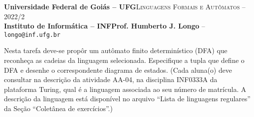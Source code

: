 \documentclass[12pt]{article}
\def\ua{04}
\begin{document}
 \begin{tcolorbox}[rounded corners, colback=blue!3, colframe=blue!40!black]
  \footnotesize\textbf{Universidade Federal de Goiás -- UFG}\hfill \textsc{Linguagens Formais e Autômatos -- 2022/2}\\
  \footnotesize\textbf{Instituto de Informática -- INF\hfill Prof. Humberto J. Longo} -- \scriptsize\texttt{longo@inf.ufg.br}
 \end{tcolorbox}\bigskip
%
\begin{tcolorbox}[rounded corners, colback=blue!2, colframe=blue!40!black, title=\textbf{Atividade AA-\ua}]
   Nesta tarefa deve-se propôr um autômato finito determinístico (DFA) que reconheça as cadeias da linguagem selecionada. Especifique a tupla que define o DFA e desenhe o correspondente diagrama de estados. (Cada aluna(o) deve consultar na descrição da atividade AA-\ua, na disciplina INF0333A da plataforma Turing, qual é a linguagem associada ao seu número de matrícula. A descrição da linguagem está disponível no arquivo ``Lista de linguagens regulares'' da Seção ``Coletânea de exercícios''.)
\end{tcolorbox}\bigskip
%
\end{document}
